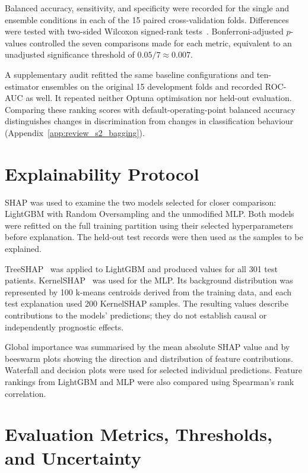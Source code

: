 Balanced accuracy, sensitivity, and specificity were recorded for the single and ensemble conditions in each of the 15 paired cross-validation folds. Differences were tested with two-sided Wilcoxon signed-rank tests~\cite{wilcoxon1945}. Bonferroni-adjusted $p$-values controlled the seven comparisons made for each metric, equivalent to an unadjusted significance threshold of $0.05/7 \approx 0.007$.

A supplementary audit refitted the same baseline configurations and ten-estimator ensembles on the original 15 development folds and recorded ROC-AUC as well. It repeated neither Optuna optimisation nor held-out evaluation. Comparing these ranking scores with default-operating-point balanced accuracy distinguishes changes in discrimination from changes in classification behaviour (Appendix~\ref{app:review_s2_bagging}).

\section{Explainability Protocol}
\label{sec:s2_xai}

SHAP was used to examine the two models selected for closer comparison: LightGBM with Random Oversampling and the unmodified MLP. Both models were refitted on the full training partition using their selected hyperparameters before explanation. The held-out test records were then used as the samples to be explained.

TreeSHAP~\cite{lundberg2020treeshap} was applied to LightGBM and produced values for all 301 test patients. KernelSHAP~\cite{lundberg2017shap} was used for the MLP. Its background distribution was represented by 100 k-means centroids derived from the training data, and each test explanation used 200 KernelSHAP samples. The resulting values describe contributions to the models' predictions; they do not establish causal or independently prognostic effects.

Global importance was summarised by the mean absolute SHAP value and by beeswarm plots showing the direction and distribution of feature contributions. Waterfall and decision plots were used for selected individual predictions. Feature rankings from LightGBM and MLP were also compared using Spearman's rank correlation.

\section{Evaluation Metrics, Thresholds, and Uncertainty}
\label{sec:s2_metrics}

